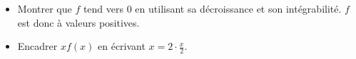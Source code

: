 \begin{itemize}
    \item Montrer que $f$ tend vers 0 en utilisant sa décroissance et son intégrabilité. $f$ est donc à valeurs positives. 
    \item Encadrer $x f(x)$ en écrivant $x=2 \cdot \frac{x}{2}$.
\end{itemize}